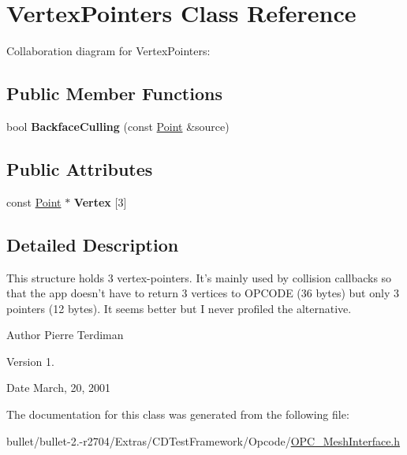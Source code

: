 \hypertarget{struct_vertex_pointers}{\section{Vertex\+Pointers Class Reference}
\label{struct_vertex_pointers}
}


Collaboration diagram for Vertex\+Pointers\+:
\subsection*{Public Member Functions}
\begin{DoxyCompactItemize}
\item 
\hypertarget{struct_vertex_pointers_a676a8fd54ec43844508eb1ff5bc11325}{bool {\bfseries Backface\+Culling} (const \hyperlink{class_point}{Point} \&source)}\label{struct_vertex_pointers_a676a8fd54ec43844508eb1ff5bc11325}

\end{DoxyCompactItemize}
\subsection*{Public Attributes}
\begin{DoxyCompactItemize}
\item 
\hypertarget{struct_vertex_pointers_aa09a8651245010b416eac5bdb1bbeeb5}{const \hyperlink{class_point}{Point} $\ast$ {\bfseries Vertex} \mbox{[}3\mbox{]}}\label{struct_vertex_pointers_aa09a8651245010b416eac5bdb1bbeeb5}

\end{DoxyCompactItemize}


\subsection{Detailed Description}
This structure holds 3 vertex-\/pointers. It's mainly used by collision callbacks so that the app doesn't have to return 3 vertices to O\+P\+C\+O\+D\+E (36 bytes) but only 3 pointers (12 bytes). It seems better but I never profiled the alternative.

\begin{DoxyAuthor}{Author}
Pierre Terdiman 
\end{DoxyAuthor}
\begin{DoxyVersion}{Version}
1. 
\end{DoxyVersion}
\begin{DoxyDate}{Date}
March, 20, 2001 
\end{DoxyDate}


The documentation for this class was generated from the following file\+:\begin{DoxyCompactItemize}
\item 
bullet/bullet-\/2.-\/r2704/\+Extras/\+C\+D\+Test\+Framework/\+Opcode/\hyperlink{_o_p_c___mesh_interface_8h}{O\+P\+C\+\_\+\+Mesh\+Interface.\+h}\end{DoxyCompactItemize}
